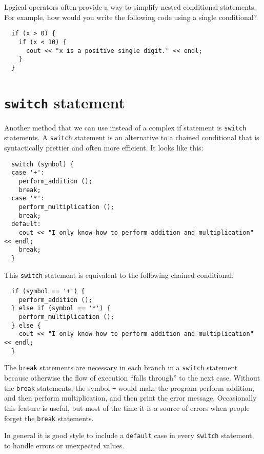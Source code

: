 
Logical operators often provide a way to simplify nested
conditional statements.  For example, how would you write
the following code using a single conditional?

\begin{verbatim}
  if (x > 0) {
    if (x < 10) {
      cout << "x is a positive single digit." << endl;
    }
  }
\end{verbatim}

\section{{\tt switch} statement}
\label{switch}

Another method that we can use instead of a complex if statement is {\tt switch}
statements.  A {\tt switch} statement
is an alternative to a chained conditional that is syntactically
prettier and often more efficient.  It looks like this:

\begin{verbatim}
  switch (symbol) {
  case '+':
    perform_addition ();
    break;
  case '*':
    perform_multiplication ();
    break;
  default:
    cout << "I only know how to perform addition and multiplication" << endl;
    break;
  }
\end{verbatim}
%
This {\tt switch} statement is equivalent to the following chained
conditional:

\begin{verbatim}
  if (symbol == '+') {
    perform_addition ();
  } else if (symbol == '*') {
    perform_multiplication ();
  } else {
    cout << "I only know how to perform addition and multiplication" << endl;
  }
\end{verbatim}
%
The {\tt break} statements are necessary in each branch
in a {\tt switch} statement because otherwise the flow of execution
``falls through'' to the next case.  Without the {\tt break} statements,
the symbol {\tt +} would make the program perform addition, and
then perform multiplication, and then print the error message.
Occasionally this feature is useful, but most of the time it is
a source of errors when people forget the {\tt break} statements.



In general it is good style to include a {\tt default} case in
every {\tt switch} statement, to handle errors or unexpected values.

